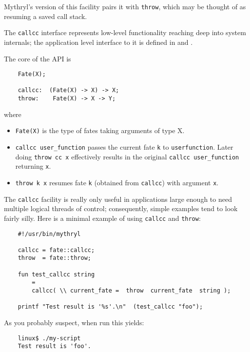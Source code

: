Mythryl's version of this facility pairs it with 
{\tt throw}, which may be thought of as resuming a saved call stack.

The {\tt callcc} interface represents low-level functionality 
reaching deep into system internals;  the application level 
interface to it is defined in  
and .

The core of the API is

\begin{verbatim}
    Fate(X);

    callcc:  (Fate(X) -> X) -> X;
    throw:    Fate(X) -> X -> Y;
\end{verbatim}

where

\begin{itemize}
\item {\tt Fate(X)} is the type of fates taking arguments of type X.
\item {\tt callcc user\_function} passes the current fate {\tt k} to {\tt userfunction}.
      Later doing {\tt throw cc x} effectively results in the original 
      {\tt callcc user\_function} returning {\tt x}.
\item {\tt throw k x} resumes fate {\tt k} (obtained from {\tt callcc}) with argument {\tt x}.
\end{itemize}

The {\tt callcc} facility is really only useful in applications large enough 
to need multiple logical threads of control;  consequently, simple examples 
tend to look fairly silly.  Here is a minimal example of using {\tt callcc} and {\tt throw}:

\begin{verbatim}
    #!/usr/bin/mythryl

    callcc = fate::callcc;
    throw  = fate::throw;

    fun test_callcc string
        =
        callcc( \\ current_fate =  throw  current_fate  string );

    printf "Test result is '%s'.\n"  (test_callcc "foo");
\end{verbatim}

As you probably suspect, when run this yields:

\begin{verbatim}
    linux$ ./my-script
    Test result is 'foo'.
\end{verbatim}

